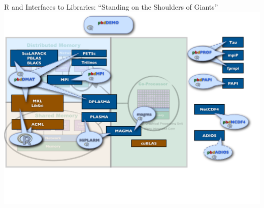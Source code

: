\begin{frame}{R and \pbdR Interfaces to Libraries: ``Standing on the Shoulders of
  Giants''}
\includegraphics[width=1.35\textheight]
{../common/pics/hardware/ParallelHardware14.pdf}
\end{frame}


